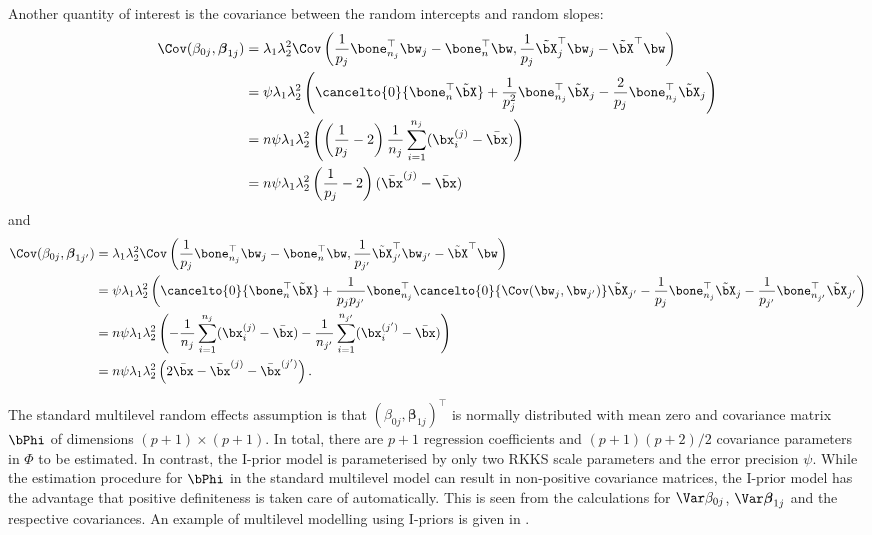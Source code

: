Another quantity of interest is the covariance between the random intercepts and random slopes:
\begin{align*}
  \Cov(\beta_{0j}, \boldsymbol{\beta}_{1j}) 
  &= \lambda_1\lambda_2^2  \Cov\left( \frac{1}{p_{j}} \bone_{n_j}^\top \bw_{j} - \bone_n^\top \bw, \frac{1}{p_{j}} \tilde\bX_{j}^\top \bw_{j} - \tilde\bX^\top \bw   \right) \\
  &= \psi\lambda_1\lambda_2^2  \left( \cancelto{0}{\bone_{n}^\top \tilde\bX} + \frac{1}{p_{j}^2} \bone_{n_j}^\top \tilde\bX_j  - \frac{2}{p_{j}} \bone_{n_{j}}^\top \tilde\bX_{j} \right) \\
  &= n\psi\lambda_1\lambda_2^2  \left(  \left(\frac{1}{p_j} - 2 \right) \frac{1}{n_{j}} \sum_{i=1}^{n_j}(\bx_i^{(j)} - \bar \bx)  \right) \\
  &= n\psi\lambda_1\lambda_2^2 \left(\frac{1}{p_j} - 2 \right) ( \bar\bx^{(j)}   -\bar \bx  ) 
\end{align*}
and
\begin{align*}
  \Cov(\beta_{0j}, \boldsymbol{\beta}_{1j'}) 
  &= \lambda_1\lambda_2^2  \Cov\left( \frac{1}{p_{j}} \bone_{n_j}^\top \bw_{j} - \bone_n^\top \bw, \frac{1}{p_{j'}} \tilde\bX_{j'}^\top \bw_{j'} - \tilde\bX^\top \bw   \right) \\
  &= \psi\lambda_1\lambda_2^2  \left( \cancelto{0}{\bone_{n}^\top \tilde\bX} + \frac{1}{p_{j}p_{j'}} \bone_{n_j}^\top \cancelto{0}{\Cov(\bw_j,\bw_{j'})} \tilde\bX_{j'} - \frac{1}{p_{j}} \bone_{n_j}^\top \tilde\bX_j  - \frac{1}{p_{j'}} \bone_{n_{j'}}^\top \tilde\bX_{j'} \right) \\
  &= n\psi\lambda_1\lambda_2^2  \left(  - \frac{1}{n_{j}} \sum_{i=1}^{n_j}(\bx_i^{(j)} - \bar \bx)  - \frac{1}{n_{j'}} \sum_{i=1}^{n_{j'}}(\bx_i^{(j')} - \bar \bx) \right) \\
  &= n\psi\lambda_1\lambda_2^2  \left(  2\bar \bx -  \bar\bx^{(j)}  -  \bar \bx^{(j')}  \right).
\end{align*}

The standard multilevel random effects assumption is that $(\beta_{0j},\boldsymbol{\beta}_{1j})^\top$ is normally distributed with mean zero and covariance matrix $\bPhi$ of dimensions $(p+1)\times(p+1)$.
In total, there are $p+1$ regression coefficients and $(p+1)(p+2)/2$ covariance parameters in $\Phi$ to be estimated.
In contrast, the I-prior model is parameterised by only two RKKS scale parameters and the error precision $\psi$.
While the estimation procedure for $\bPhi$ in the standard multilevel model can result in non-positive covariance matrices, the I-prior model has the advantage that positive definiteness is taken care of automatically.
This is seen from the calculations for $\Var \beta_{0j}$, $\Var \boldsymbol\beta_{1j}$ and the respective covariances.
An example of multilevel modelling using I-priors is given in .

